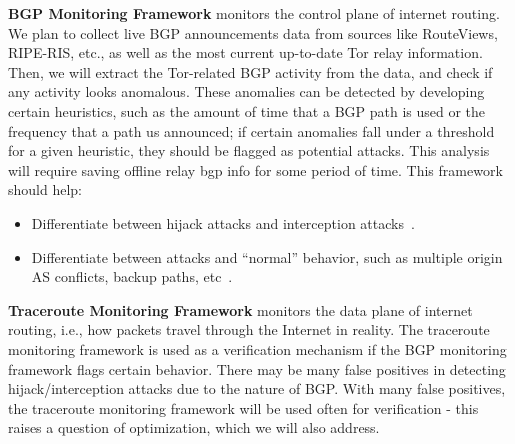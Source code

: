 {\bf BGP Monitoring Framework} monitors the control plane of internet routing. We plan to collect live BGP announcements data from sources like RouteViews, RIPE-RIS, etc., as well as the most current up-to-date Tor relay information. Then, we will extract the Tor-related BGP activity from the data, and check if any activity looks anomalous.  These anomalies can be detected by developing certain heuristics, such as the amount of time that a BGP path is used or the frequency that a path us announced; if certain anomalies fall under a threshold for a given heuristic, they should be flagged as potential attacks. This analysis will require saving offline relay bgp info for some period of time.  This framework should help:
\begin{itemize}
\item Differentiate between hijack attacks and interception attacks~\cite{ballani2007study}.
\item Differentiate between attacks and ``normal'' behavior, such as multiple origin AS conflicts, backup paths, etc~\cite{zhao2001analysis}.
\end{itemize}

{\bf Traceroute Monitoring Framework} monitors the data plane of internet routing, i.e., how packets travel through the Internet in reality. The traceroute monitoring framework is used as a verification mechanism if the BGP monitoring framework flags certain behavior. There may be many false positives in detecting hijack/interception attacks due to the nature of BGP.  With many false positives, the traceroute monitoring framework will be used often for verification - this raises a question of optimization, which we will also address.

